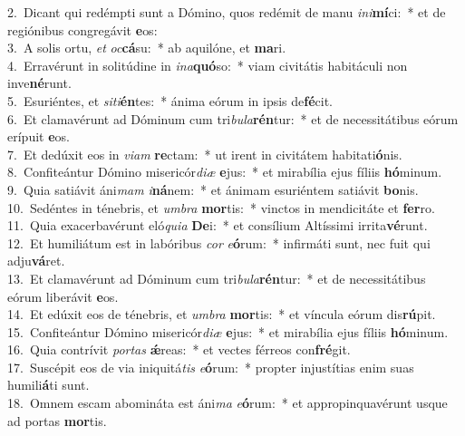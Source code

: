 {2.~}Dicant qui redémpti sunt a Dómino, quos redémit de manu \textit{i}\textit{ni}\textbf{mí}ci:~* et de regiónibus congregávit \textbf{e}os:\\
{3.~}A solis ortu, \textit{et} \textit{oc}\textbf{cá}su:~* ab aquilóne, et \textbf{ma}ri.\\
{4.~}Erravérunt in solitúdine in \textit{i}\textit{na}\textbf{quó}so:~* viam civitátis habitáculi non inve\textbf{né}runt.\\
{5.~}Esuriéntes, et \textit{si}\textit{ti}\textbf{én}tes:~* ánima eórum in ipsis de\textbf{fé}cit.\\
{6.~}Et clamavérunt ad Dóminum cum tri\textit{bu}\textit{la}\textbf{rén}tur:~* et de necessitátibus eórum erípuit \textbf{e}os.\\
{7.~}Et dedúxit eos in \textit{vi}\textit{am} \textbf{re}ctam:~* ut irent in civitátem habitati\textbf{ó}nis.\\
{8.~}Confiteántur Dómino misericór\textit{di}\textit{æ} \textbf{e}jus:~* et mirabília ejus fíliis \textbf{hó}minum.\\
{9.~}Quia satiávit áni\textit{mam} \textit{i}\textbf{ná}nem:~* et ánimam esuriéntem satiávit \textbf{bo}nis.\\
{10.~}Sedéntes in ténebris, et \textit{um}\textit{bra} \textbf{mor}tis:~* vinctos in mendicitáte et \textbf{fer}ro.\\
{11.~}Quia exacerbavérunt eló\textit{qui}\textit{a} \textbf{De}i:~* et consílium Altíssimi irrita\textbf{vé}runt.\\
{12.~}Et humiliátum est in labóribus \textit{cor} \textit{e}\textbf{ó}rum:~* infirmáti sunt, nec fuit qui adju\textbf{vá}ret.\\
{13.~}Et clamavérunt ad Dóminum cum tri\textit{bu}\textit{la}\textbf{rén}tur:~* et de necessitátibus eórum liberávit \textbf{e}os.\\
{14.~}Et edúxit eos de ténebris, et \textit{um}\textit{bra} \textbf{mor}tis:~* et víncula eórum dis\textbf{rú}pit.\\
{15.~}Confiteántur Dómino misericór\textit{di}\textit{æ} \textbf{e}jus:~* et mirabília ejus fíliis \textbf{hó}minum.\\
{16.~}Quia contrívit \textit{por}\textit{tas} \textbf{ǽ}reas:~* et vectes férreos con\textbf{fré}git.\\
{17.~}Suscépit eos de via iniquitá\textit{tis} \textit{e}\textbf{ó}rum:~* propter injustítias enim suas humili\textbf{á}ti sunt.\\
{18.~}Omnem escam abomináta est áni\textit{ma} \textit{e}\textbf{ó}rum:~* et appropinquavérunt usque ad portas \textbf{mor}tis.\\
